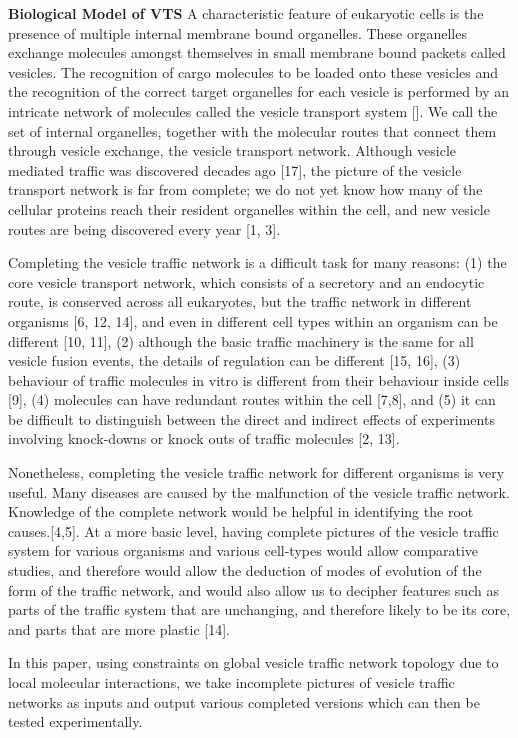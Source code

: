 \textbf{Biological Model of VTS}
%
A characteristic feature of eukaryotic cells is the presence of multiple internal membrane bound organelles. 
%
These organelles exchange molecules amongst themselves in small membrane bound packets called vesicles. 
%
The recognition of cargo molecules to be loaded onto these vesicles and the recognition of the correct target organelles for each vesicle is performed by an intricate network of molecules called the vesicle transport system []. 
%
We call the set of internal organelles, together with the molecular routes that connect them through vesicle exchange, the vesicle transport network. 
%
Although vesicle mediated traffic was discovered decades ago [17], the picture of the vesicle transport network is far from complete; we do not yet know how many of the cellular proteins reach their resident organelles within the cell, and new vesicle routes are being discovered every year [1, 3]. 

Completing the vesicle traffic network is a difficult task for many reasons: (1) the core vesicle transport network, which consists of a secretory and an endocytic route, is conserved across all eukaryotes, but the traffic network in different organisms [6, 12, 14], and even in different cell types within an organism can be different [10, 11], (2) although the basic traffic machinery is the same for all vesicle fusion events, the details of regulation can be different [15, 16], (3) behaviour of traffic molecules in vitro is different from their behaviour inside cells [9], (4) molecules can have redundant routes within the cell [7,8], and (5) it can be difficult to distinguish between the direct and indirect effects of experiments involving knock-downs or knock outs of traffic molecules [2, 13].

Nonetheless, completing the vesicle traffic network for different organisms is very useful. Many diseases are caused by the malfunction of the vesicle traffic network. Knowledge of the complete network would be helpful in identifying the root causes.[4,5]. At a more basic level, having complete pictures of the vesicle traffic system for various organisms and various cell-types would allow comparative studies, and therefore would allow the deduction of modes of evolution of the form of the traffic network, and would also allow us to decipher features such as parts of the traffic system that are unchanging, and therefore likely to be its core, and parts that are more plastic [14].

In this paper, using constraints on global vesicle traffic network topology due to local molecular interactions, we take incomplete pictures of vesicle traffic networks as inputs and output various completed versions which can then be tested experimentally.


